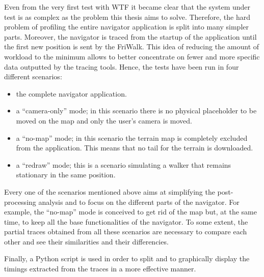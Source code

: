 Even from the very first test with WTF it became clear that the system under
test is as complex as the problem this thesis aims to solve. Therefore, the hard
problem of profiling the entire navigator application is split into many simpler
parts. Moreover, the navigator is traced from the startup of the application
until the first new position is sent by the FriWalk. This idea of reducing the
amount of workload to the minimum allows to better concentrate on fewer and more
specific data outputted by the tracing tools. Hence, the tests have been run in
four different scenarios:
\begin{itemize}
    \item the complete navigator application.
    \item a ``camera-only'' mode; in this scenario there is no physical placeholder
        to be moved on the map and only the user's camera is moved.
    \item a ``no-map'' mode; in this scenario the terrain map is completely
        excluded from the application. This means that no tail for the terrain is
        downloaded.
    \item a ``redraw'' mode; this is a scenario simulating a walker that remains
        stationary in the same position.
\end{itemize}

Every one of the scenarios mentioned above aims at simplifying the post-processing
analysis and to focus on the different parts of the navigator. For example, the
``no-map'' mode is conceived to get rid of the map but, at the same time, to keep
all the base functionalities of the navigator. To some extent, the partial traces
obtained from all these scenarios are necessary to compare each other and see their
similarities and their differencies.

Finally, a Python script is used in order to split and to graphically display the
timings extracted from the traces in a more effective manner.
